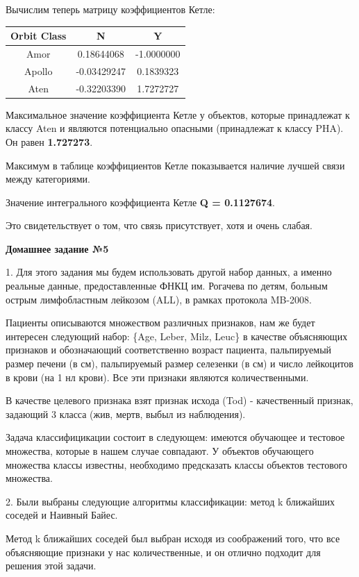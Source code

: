 \documentclass{article}
\begin{document}
Вычислим теперь матрицу коэффициентов Кетле:

\begin{center}
	\begin{tabular}{|c|c|c|}
		\hline
		Orbit Class & N & Y \\
		\hline
		Amor & 0.18644068 & -1.0000000 \\
		\hline
		Apollo & -0.03429247 & 0.1839323 \\
		\hline
		Aten & -0.32203390 & 1.7272727 \\
		\hline
	\end{tabular}
\end{center}

Максимальное значение коэффициента Кетле у объектов, которые принадлежат к классу Aten и являются потенциально опасными (принадлежат к классу PHA). Он равен \textbf{1.727273}.

Максимум в таблице коэффициентов Кетле показывается наличие лучшей связи между категориями.

Значение интегрального коэффициента Кетле \textbf{Q = 0.1127674}.

Это свидетельствует о том, что связь присутствует, хотя и очень слабая.

$$$$
\large \textbf{Домашнее задание №5}

1. Для этого задания мы будем использовать другой набор данных, а именно реальные данные, предоставленные ФНКЦ им. Рогачева по детям, больным острым лимфобластным лейкозом (ALL), в рамках протокола MB-2008.

Пациенты описываются множеством различных признаков, нам же будет интересен следующий набор: \{Age, Leber, Milz, Leuc\} в качестве объясняющих признаков и обозначающий соответственно возраст пациента, пальпируемый размер печени (в см), пальпируемый размер селезенки (в см) и число лейкоцитов в крови (на 1 нл крови). Все эти признаки являются количественными.

В качестве целевого признака взят признак исхода (Tod) - качественный признак, задающий 3 класса (жив, мертв, выбыл из наблюдения).

Задача классифицикации состоит в следующем: имеются обучающее и тестовое множества, которые в нашем случае совпадают. У объектов обучающего множества классы известны, необходимо предсказать классы объектов тестового множества.

2. Были выбраны следующие алгоритмы классификации: метод k ближайших соседей и Наивный Байес.

Метод k ближайших соседей был выбран исходя из соображений того, что все объясняющие признаки у нас количественные, и он отлично подходит для решения этой задачи.
\end{document}
